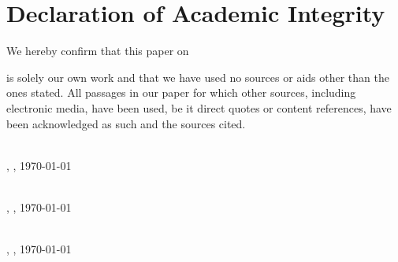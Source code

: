 \chapter*{Declaration of Academic Integrity}
We hereby confirm that this paper on
\begin{center}
\textit{\printtitle}
\end{center}
is solely our own work and that we have used no sources or aids other than the ones stated. All
passages in our paper for which other sources, including electronic media, have been used, be it
direct quotes or content references, have been acknowledged as such and the sources cited.


\vspace{0.75cm}
\parbox{17em}{\hrulefill} \\
\printnameMaxi, \printcity, \today

\vspace{0.75cm}
\parbox{17em}{\hrulefill} \\
\printnameTimo, \printcity, \today

\vspace{0.75cm}
\parbox{17em}{\hrulefill} \\
\printnameHendrik, \printcity, \today
